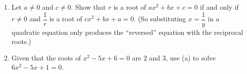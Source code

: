 \begin{enumerate}
\item[(a)] Let $a\ne0$ and $c\ne0$. Show that $r$ is a root of $ax^2+bx+c=0$ if and only if $r\ne0$ and $\dfrac{1}{r}$ is a root of $cx^2+bx+a=0$. (So substituting $x=\dfrac{1}{y}$ in a quadratic equation only produces the ``reversed'' equation with the reciprocal roots.)
\item[(b)] Given that the roots of $x^2-5x+6=0$ are $2$ and $3$, use (a) to solve $6x^2-5x+1=0$.
\end{enumerate}
